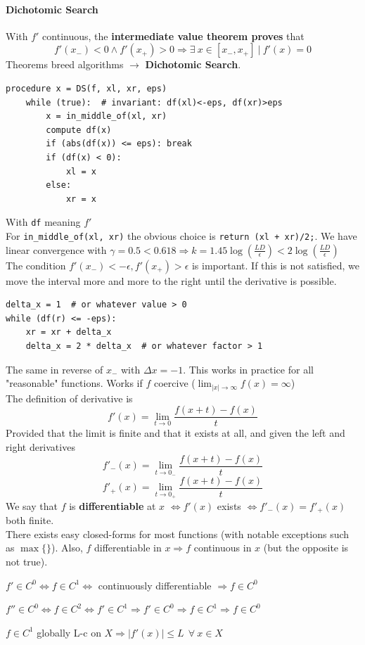 \documentclass[10pt]{report}
\begin{document}
\paragraph{Dichotomic Search} With $f'$ continuous, the \textbf{intermediate value theorem proves} that  $$f'(x_-) < 0 \wedge f'(x_+) > 0 \Rightarrow \exists\:x\in[x_-, x_+]\:|\: f'(x) = 0$$
Theorems breed algorithms $\rightarrow$ \textbf{Dichotomic Search}.
\begin{lstlisting}[style=myPython]
procedure x = DS(f, xl, xr, eps)
	while (true):  # invariant: df(xl)<-eps, df(xr)>eps
		x = in_middle_of(xl, xr)
		compute df(x)
		if (abs(df(x)) <= eps): break
		if (df(x) < 0):
			xl = x
		else:
			xr = x
\end{lstlisting}
With \texttt{df} meaning $f'$\\
For \texttt{in\_middle\_of(xl, xr)} the obvious choice is \texttt{return (xl + xr)/2;}. We have linear convergence with $\gamma = 0.5 < 0.618 \Rightarrow k = 1.45\log(\frac{LD}{\epsilon}) < 2 \log(\frac{LD}{\epsilon})$\\
The condition $f'(x_-) < -\epsilon, f'(x_+) > \epsilon$ is important. If this is not satisfied, we move the interval more and more to the right until the derivative is possible.
\begin{lstlisting}[style=myPython]
delta_x = 1  # or whatever value > 0
while (df(r) <= -eps):
	xr = xr + delta_x
	delta_x = 2 * delta_x  # or whatever factor > 1
\end{lstlisting}
The same in reverse of $x_-$ with $\Delta x = -1$. This works in practice for all "reasonable" functions. Works if $f$ coercive ($\lim_{|x| \to \infty} f(x) = \infty$)\\
The definition of derivative is
$$f'(x) = \lim_{t\to 0} \frac{f(x+t)-f(x)}{t}$$
Provided that the limit is finite and that it exists at all, and given the left and right derivatives
$$f'_-(x) = \lim_{t\to 0_-} \frac{f(x+t)-f(x)}{t}$$
$$f'_+(x) = \lim_{t\to 0_+} \frac{f(x+t)-f(x)}{t}$$
We say that $f$ is \textbf{differentiable} at $x$ $\Leftrightarrow f'(x)$ exists $\Leftrightarrow f'_-(x)=f'_+(x)$ both finite.\\
There exists easy closed-forms for most functions (with notable exceptions such as $\max\{\}$). Also, $f$ differentiable in $x \Rightarrow f$ continuous in $x$ (but the opposite is not true).
\begin{list}{}{}
	\item $f' \in C^0 \Leftrightarrow f \in C^1 \Leftrightarrow$ continuously differentiable $\Rightarrow f\in C^0$
	\item $f'' \in C^0 \Leftrightarrow f\in C^2 \Leftrightarrow f' \in C^1 \Rightarrow f' \in C^0 \Rightarrow f \in C^1 \Rightarrow f \in C^0$
	\item $f \in C^1$ globally L-c on $X \Rightarrow |f'(x)| \leq L\:\:\forall\: x \in X$
\end{list}
\end{document}
